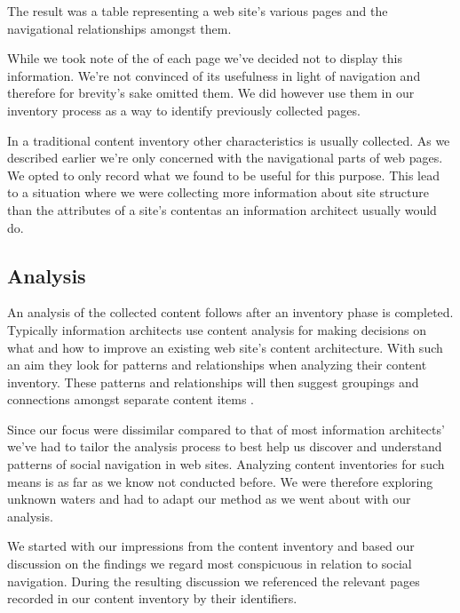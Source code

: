 The result was a table representing a web site's various pages and the
navigational relationships amongst them.

While we took note of the  of each page we've decided not to display
this information. We're not convinced of its usefulness in light of
navigation and therefore for brevity's sake omitted them. We did however use
them in our inventory process as a way to identify previously collected pages.

In a traditional content inventory other characteristics
is usually collected.%
As we described earlier we're only concerned with the navigational parts of
web pages. We opted to only record what we found to be useful for this
purpose. This lead to a situation where we were collecting more information
about site structure than the attributes of a site's content\dash{}as an
information architect usually would do.

\subsection{Analysis}

An analysis of the collected content follows after an inventory phase is
completed. Typically information architects use content analysis for
making decisions on what and how to improve an existing web site's content
architecture. With such an aim they look for patterns and relationships when
analyzing their content inventory. These patterns and relationships will then
suggest groupings and connections amongst separate content items
\cite[]{morville06}.

Since our focus were dissimilar compared to that of most information
architects' we've had to tailor the analysis process to best help us discover
and understand patterns of social navigation in web sites. Analyzing content
inventories for such means is as far as we know not conducted before. We were
therefore exploring unknown waters and had to adapt our method as we
went about with our analysis.

We started with our impressions from the content inventory%
and based our discussion on the findings we regard most conspicuous in
relation to social navigation. During the resulting discussion we
referenced the relevant pages recorded in our content inventory by their
identifiers.

